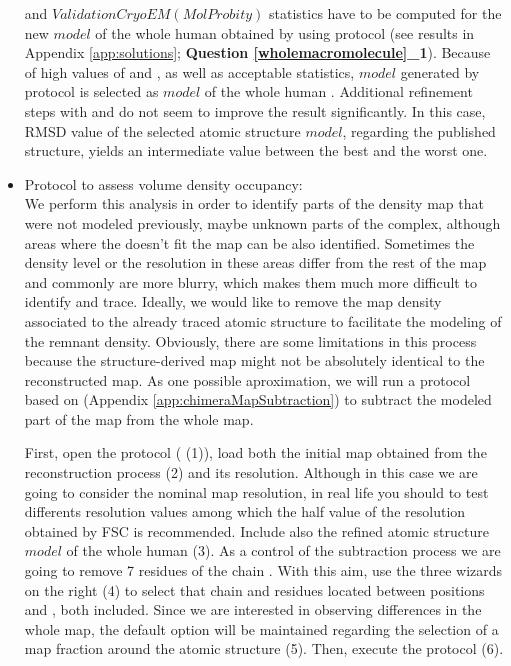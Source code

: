 \begin{itemize}
 \emringer and $Validation CryoEM (MolProbity)$ statistics have to be computed for the new $model$ of the whole human  obtained by using \chimera {} protocol (see results  in Appendix \ref{app:solutions}; \textbf{Question \ref{wholemacromolecule}\_1}). Because of high values of \ccmask and \emringer {}, as well as acceptable \molprobity statistics, $model$ generated by \chimera {} protocol is selected as $model$ of the whole human . Additional refinement steps with \phenix {} and  do not seem to improve the result significantly. In this case, RMSD value of the selected atomic structure $model$, regarding the published structure, yields an intermediate value between the best and the worst one.\\
 
 \item Protocol  to assess volume density occupancy:\\
 
 We perform this analysis in order to identify parts of the density map that were not modeled previously, maybe unknown parts of the complex, although areas where the  doesn't fit the map can be also identified. Sometimes the density level or the resolution in these areas differ from the rest of the map and commonly are more blurry, which makes them much more difficult to identify and trace. Ideally, we would like to remove the map density associated to the already traced atomic structure to facilitate the modeling of the remnant density. Obviously, there are some limitations in this process because the structure-derived map might not be absolutely identical to the reconstructed map. As one possible aproximation, we will run a protocol based on \chimera (Appendix \ref{app:chimeraMapSubtraction}) to subtract the modeled part of the map from the whole map.
 
 First, open the \chimera {} protocol ( (1)), load both the initial map obtained from the reconstruction process (2) and its resolution. Although in this case we are going to consider the nominal map resolution, in real life you should to test differents resolution values among which the half value of the resolution obtained by FSC is recommended. Include also the refined atomic structure $model$ of the whole human  (3). As a control of the subtraction process we are going to remove 7 residues of the chain . With this aim, use the three wizards on the right (4) to select that chain and residues located between positions  and , both included. Since we are interested in observing differences in the whole map, the default option  will be maintained regarding the selection of a map fraction around the atomic structure (5). Then, execute the protocol (6). 
 

\end{itemize}
